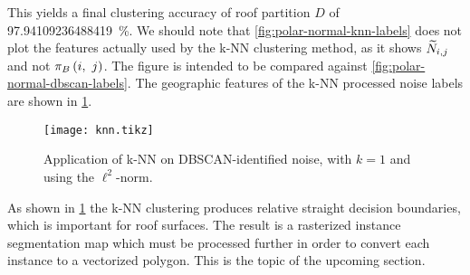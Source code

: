This yields a final clustering accuracy of roof partition $D$ of \SI[round-mode=places,round-precision=1]{97.94109236488419}{\percent}.
We should note that \cref{fig:polar-normal-knn-labels} does not plot the features actually used by the k-NN clustering method, as it shows $\widetilde{N}_{i,j}$ and not $\pi_{B}\left(i,~j\right)$.
The figure is intended to be compared against \cref{fig:polar-normal-dbscan-labels}.
The geographic features of the k-NN processed noise labels are shown in \cref{fig:knn-tile}.
\begin{figure}[H]
  \centering
  \texttt{[image: knn.tikz]}
  \caption{Application of k-NN on DBSCAN-identified noise, with $k = 1$ and using the $\ell^2$-norm.}
  \label{fig:knn-tile}
\end{figure}
\noindent
As shown in \cref{fig:knn-tile} the k-NN clustering produces relative straight decision boundaries, which is important for roof surfaces.
The result is a rasterized instance segmentation map which must be processed further in order to convert each instance to a vectorized polygon.
This is the topic of the upcoming section.
\newpage
